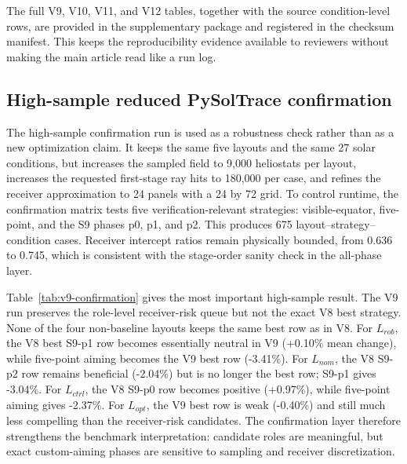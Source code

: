 \documentclass[final,3p,times]{elsarticle}
\begin{document}
The full V9, V10, V11, and V12 tables, together with the source condition-level rows, are provided in the supplementary package and registered in the checksum manifest. This keeps the reproducibility evidence available to reviewers without making the main article read like a run log.

\iffalse

\subsection{High-sample reduced PySolTrace confirmation}
The high-sample confirmation run is used as a robustness check rather than as a new optimization claim. It keeps the same five layouts and the same 27 solar conditions, but increases the sampled field to 9,000 heliostats per layout, increases the requested first-stage ray hits to 180,000 per case, and refines the receiver approximation to 24 panels with a 24 by 72 grid. To control runtime, the confirmation matrix tests five verification-relevant strategies: visible-equator, five-point, and the S9 phases p0, p1, and p2. This produces 675 layout--strategy--condition cases. Receiver intercept ratios remain physically bounded, from 0.636 to 0.745, which is consistent with the stage-order sanity check in the all-phase layer.

Table~\ref{tab:v9-confirmation} gives the most important high-sample result. The V9 run preserves the role-level receiver-risk queue but not the exact V8 best strategy. None of the four non-baseline layouts keeps the same best row as in V8. For $L_{rob}$, the V8 best S9-p1 row becomes essentially neutral in V9 (+0.10\% mean change), while five-point aiming becomes the V9 best row (-3.41\%). For $L_{nom}$, the V8 S9-p2 row remains beneficial (-2.04\%) but is no longer the best row; S9-p1 gives -3.04\%. For $L_{ctrl}$, the V8 S9-p0 row becomes positive (+0.97\%), while five-point aiming gives -2.37\%. For $L_{opt}$, the V9 best row is weak (-0.40\%) and still much less compelling than the receiver-risk candidates. The confirmation layer therefore strengthens the benchmark interpretation: candidate roles are meaningful, but exact custom-aiming phases are sensitive to sampling and receiver discretization.
\end{document}
